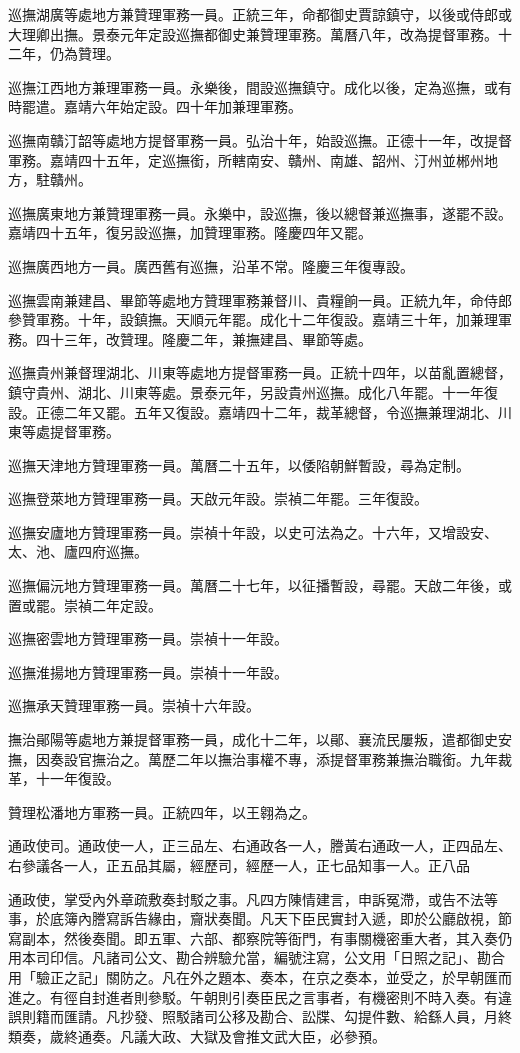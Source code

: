 巡撫湖廣等處地方兼贊理軍務一員。正統三年，命都御史賈諒鎮守，以後或侍郎或大理卿出撫。景泰元年定設巡撫都御史兼贊理軍務。萬曆八年，改為提督軍務。十二年，仍為贊理。

巡撫江西地方兼理軍務一員。永樂後，間設巡撫鎮守。成化以後，定為巡撫，或有時罷遣。嘉靖六年始定設。四十年加兼理軍務。

巡撫南贛汀韶等處地方提督軍務一員。弘治十年，始設巡撫。正德十一年，改提督軍務。嘉靖四十五年，定巡撫銜，所轄南安、贛州、南雄、韶州、汀州並郴州地方，駐贛州。

巡撫廣東地方兼贊理軍務一員。永樂中，設巡撫，後以總督兼巡撫事，遂罷不設。嘉靖四十五年，復另設巡撫，加贊理軍務。隆慶四年又罷。

巡撫廣西地方一員。廣西舊有巡撫，沿革不常。隆慶三年復專設。

巡撫雲南兼建昌、畢節等處地方贊理軍務兼督川、貴糧餉一員。正統九年，命侍郎參贊軍務。十年，設鎮撫。天順元年罷。成化十二年復設。嘉靖三十年，加兼理軍務。四十三年，改贊理。隆慶二年，兼撫建昌、畢節等處。

巡撫貴州兼督理湖北、川東等處地方提督軍務一員。正統十四年，以苗亂置總督，鎮守貴州、湖北、川東等處。景泰元年，另設貴州巡撫。成化八年罷。十一年復設。正德二年又罷。五年又復設。嘉靖四十二年，裁革總督，令巡撫兼理湖北、川東等處提督軍務。

巡撫天津地方贊理軍務一員。萬曆二十五年，以倭陷朝鮮暫設，尋為定制。

巡撫登萊地方贊理軍務一員。天啟元年設。崇禎二年罷。三年復設。

巡撫安廬地方贊理軍務一員。崇禎十年設，以史可法為之。十六年，又增設安、太、池、廬四府巡撫。

巡撫偏沅地方贊理軍務一員。萬曆二十七年，以征播暫設，尋罷。天啟二年後，或置或罷。崇禎二年定設。

巡撫密雲地方贊理軍務一員。崇禎十一年設。

巡撫淮揚地方贊理軍務一員。崇禎十一年設。

巡撫承天贊理軍務一員。崇禎十六年設。

撫治鄖陽等處地方兼提督軍務一員，成化十二年，以鄖、襄流民屢叛，遣都御史安撫，因奏設官撫治之。萬歷二年以撫治事權不專，添提督軍務兼撫治職銜。九年裁革，十一年復設。

贊理松潘地方軍務一員。正統四年，以王翱為之。

通政使司。通政使一人，正三品左、右通政各一人，謄黃右通政一人，正四品左、右參議各一人，正五品其屬，經歷司，經歷一人，正七品知事一人。正八品

通政使，掌受內外章疏敷奏封駁之事。凡四方陳情建言，申訴冤滯，或告不法等事，於底簿內謄寫訴告緣由，齎狀奏聞。凡天下臣民實封入遞，即於公廳啟視，節寫副本，然後奏聞。即五軍、六部、都察院等衙門，有事關機密重大者，其入奏仍用本司印信。凡諸司公文、勘合辨驗允當，編號注寫，公文用「日照之記」、勘合用「驗正之記」關防之。凡在外之題本、奏本，在京之奏本，並受之，於早朝匯而進之。有徑自封進者則參駁。午朝則引奏臣民之言事者，有機密則不時入奏。有違誤則籍而匯請。凡抄發、照駁諸司公移及勘合、訟牒、勾提件數、給繇人員，月終類奏，歲終通奏。凡議大政、大獄及會推文武大臣，必參預。

